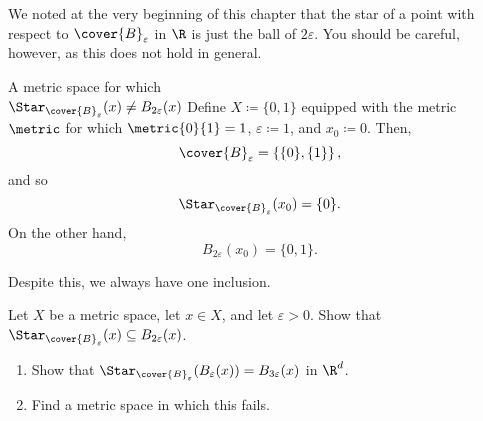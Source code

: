 We noted at the very beginning of this chapter that the star of a point with respect to $\cover{B}_{\varepsilon}$ in $\R$ is just the ball of $2\varepsilon$.  You should be careful, however, as this does not hold in general.
\begin{exm}{A metric space for which \\ $\Star _{\cover{B}_{\varepsilon}}(x)\neq B_{2\varepsilon}(x)$}{}
Define $X\coloneqq \{ 0,1\}$ equipped with the metric $\metric$ for which $\metric{0}{1}=1$, $\varepsilon \coloneqq 1$, and $x_0\coloneqq 0$.  Then,
\begin{equation}
\cover{B}_{\varepsilon}=\left\{ \{ 0\} ,\{ 1\} \right\} ,
\end{equation}
and so
\begin{equation}
\Star _{\cover{B}_{\varepsilon}}(x_0)=\{ 0\} .
\end{equation}
On the other hand,
\begin{equation}
B_{2\varepsilon}(x_0)=\{ 0,1\} .
\end{equation}
\end{exm}
Despite this, we always have one inclusion.
\begin{exr}{}{}
Let $X$ be a metric space, let $x\in X$, and let $\varepsilon >0$.  Show that $\Star _{\cover{B}_{\varepsilon}}(x)\subseteq B_{2\varepsilon}(x)$.
\end{exr}
\begin{exr}{}{}
\begin{enumerate}
\item Show that $\Star _{\cover{B}_{\varepsilon}}(B_{\varepsilon}(x))=B_{3\varepsilon}(x)$ in $\R ^d$.
\item Find a metric space in which this fails.
\end{enumerate}
\end{exr}

